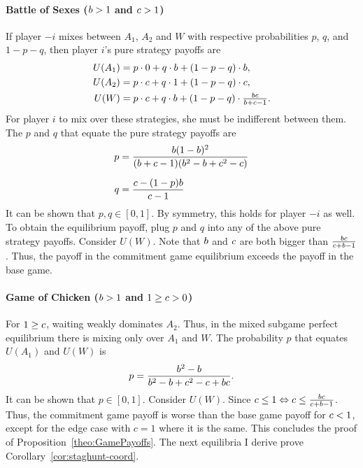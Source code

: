 \documentclass[../paper.tex]{subfiles}
\begin{document}
\paragraph{Battle of Sexes ($b>1$ and $c>1$)}
If player $-i$ mixes between $A_1$, $A_2$ and $W$ with respective probabilities $p$, $q$, and $1-p-q$, then player $i$'s pure strategy payoffs are
\begin{align*}
U(A_1) &= p\cdot 0 + q\cdot b + (1-p-q)\cdot b,\\[0mm]
U(A_2) &= p\cdot c + q\cdot 1 + (1-p-q)\cdot c,\\[0mm]
U(W) &= p\cdot c + q\cdot b + (1-p-q)\cdot \tfrac{bc}{b+c-1}.
\end{align*}
For player $i$ to mix over these strategies, she must be indifferent between them. The $p$ and $q$ that equate the pure strategy payoffs are
\begin{alignat*}{1}
    p &= \frac{b(1-b)^2}{(b+c-1)(b^2-b+c^2-c)}\\[6pt]
    q &= \frac{c-(1-p)b}{c-1}
\end{alignat*}
It can be shown that $p,q\in[0,1]$. By symmetry, this holds for player $-i$ as well. To obtain the equilibrium payoff, plug $p$ and $q$ into any of the above pure strategy payoffs. Consider $U(W)$. Note that $b$ and $c$ are both bigger than $\tfrac{bc}{c+b-1}$. Thus, the payoff in the commitment game equilibrium exceeds the payoff in the base game.
\paragraph{Game of Chicken ($b>1$ and $1\geq c>0$)}
For $1\geq c$, waiting weakly dominates $A_2$. Thus, in the mixed subgame perfect equilibrium there is mixing only over $A_1$ and $W$. The probability $p$ that equates $U(A_1)$ and $U(W)$ is 
\[
p=\frac{b^2-b}{b^2-b+c^2-c+bc}.
\]
It can be shown that $p\in[0,1]$. Consider $U(W)$. Since $c\leq1\Leftrightarrow c\leq\tfrac{bc}{c+b-1}$. Thus, the commitment game payoff is worse than the base game payoff for $c<1$, except for the edge case with $c=1$ where it is the same.
\vspace{0.5cm}
\newline
This concludes the proof of Proposition~\ref{theo:GamePayoffs}. The next equilibria I derive prove Corollary~\ref{cor:staghunt-coord}.
\end{document}
